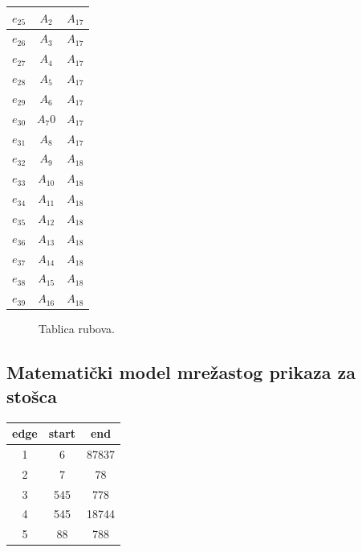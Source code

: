 \documentclass[a4paper,12pt]{article}
\begin{document}
\begin{center}
\begin{tabular}{||c | c | c ||}
         $e_{25}$ & $A_{2}$ & $A_{17}$   \\
         \hline
         $e_{26}$ & $A_{3}$  & $A_{17}$  \\
         \hline
         $e_{27}$ & $A_{4}$ & $A_{17}$  \\ 
         \hline
         $e_{28}$& $A_{5}$ & $A_{17}$  \\
         \hline
         $e_{29}$ & $A_{6}$ & $A_{17}$  \\
         \hline
         $e_{30}$ & $A_{7}$0 & $A_{17}$  \\
         \hline
         $e_{31}$ & $A_{8}$ & $A_{17}$  \\ 
         \hline
         $e_{32}$ & $A_{9}$ & $A_{18}$  \\
         \hline
         $e_{33}$ & $A_{10}$ & $A_{18}$   \\
         \hline
         $e_{34}$ & $A_{11}$ & $A_{18}$   \\
         \hline
         $e_{35}$ & $A_{12}$  &$A_{18}$  \\
         \hline
         $e_{36}$ & $A_{13}$ &$A_{18}$  \\ 
         \hline
         $e_{37}$& $A_{14}$ & $A_{18}$  \\
         \hline
         $e_{38}$ & $A_{15}$ & $A_{18}$   \\
         \hline
         $e_{39}$ & $A_{16}$ &$A_{18}$ \\[1ex] 
         
        \end{tabular}
        \end{center}
        \begin{figure}[ht]
            \centering
            \caption{Tablica rubova.}
        \end{figure}

    \subsection{Matematički model mrežastog prikaza za stošca}
\begin{flushleft}
    \begin{tabular}{||c | c | c ||} 
     \hline
     edge & start & end \\ [0.5ex] 
     \hline\hline
     1 & 6 & 87837  \\ 
     \hline
     2 & 7 & 78  \\
     \hline
     3 & 545 & 778  \\
     \hline
     4 & 545 & 18744 \\
     \hline
     5 & 88 & 788  \\ [1ex] 
     \hline
    \end{tabular}
    \end{flushleft}
\end{document}
